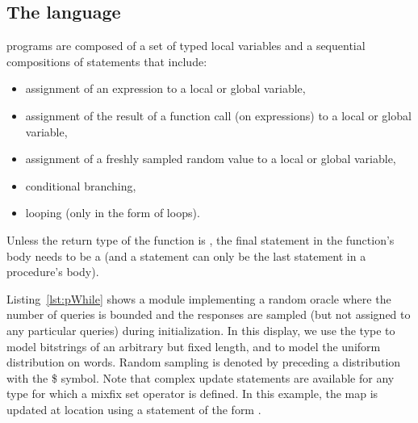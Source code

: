 \subsection{The \pWHILE language}
\pWHILE programs are composed of a set of typed local variables and a
sequential compositions of statements that include:
\begin{itemize}\itemsep-.5em
\item assignment of an expression to a local or global variable,
\item assignment of the result of a function call (on expressions) to a local
  or global variable,
\item assignment of a freshly sampled random value to a local or global
  variable,
\item conditional branching,
\item looping (only in the form of  loops).
\end{itemize}
Unless the return type of the function is , the final statement in
the function's body needs to be a  (and a 
statement can only be the last statement in a procedure's body).

Listing~\ref{lst:pWhile} shows a module implementing a random oracle where the
number of queries is bounded and the responses are sampled (but not assigned to
any particular queries) during initialization. In this display, we use the type
 to model bitstrings of an arbitrary but fixed length, and
 to model the uniform distribution on words. Random sampling is
denoted by preceding a distribution with the \textsf{\$} symbol. Note that
complex update statements are available for any type for which a mixfix set
operator is defined. In this example, the map  is updated at location
 using a statement of the form .


